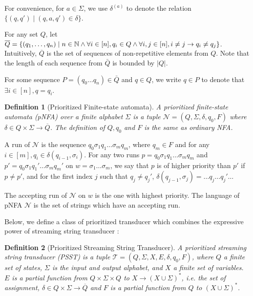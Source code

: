 \documentclass[sigplan,review,anonymous]{acmart}\settopmatter{printfolios=true,printccs=false,printacmref=false}
\newtheorem{definition}{Definition}
\newcommand\pnfa{\mathcal{N}}
\newcommand\psst{\mathcal{T}}
\begin{document}
For convenience, for $a \in \Sigma$, we use $\delta^{(a)}$ to denote the  relation $\{(q, q') \mid (q, a, q') \in \delta\}$.

For any set $Q$, let $\overline{Q} = \{ (q_1, \ldots, q_n) \mid n \in \mathbb{N} \wedge \forall i \in [n], q_i \in Q \wedge \forall i,j \in[n], i
  \neq j \rightarrow q_i \neq q_j \}$. Intuitively, $\overline{Q}$ is the set of
sequences of non-repetitive elements from $Q$. Note that the length of each sequence from $\bar{Q}$ is bounded by 
  $| Q |$.
  
For some sequence $P = (q_0 \ldots q_n) \in \bar{Q}$ and  $q \in Q$, we write $q \in P$ to denote that
  $\exists i \in [n], q = q_i$.

\begin{definition}[Prioritized Finite-state automata]
  A prioritized finite-state automata (pNFA) over a finite alphabet $\Sigma$ is a tuple $\pnfa=(Q, \Sigma, \delta, q_0, F)$ where $\delta \in Q
  \times \Sigma \rightarrow \overline{Q}$. The definition of $Q, q_0$ and $F$ is the same as ordinary NFA.
\end{definition}

A run of $\pnfa$ is the sequence $q_0 \sigma_1 q_1 \ldots \sigma_m q_m$, where $q_m \in F$ and for any $i \in [m], q_i \in \delta (q_{i - 1}, \sigma_i)$.
  For any two runs $p = q_0 \sigma_1 q_1 \ldots \sigma_m q_m$ and $p' =
  q_0 \sigma_1 q_1' \ldots \sigma_m q_m'$ on $w = \sigma_1 \ldots \sigma_m$, we say that $p$ is of higher priority than
  $p'$ if $p \neq p'$, and for the first index $j$ such that $q_j \neq q_j'$,
  $\delta (q_{j - 1}, \sigma_j) = \ldots q_j \ldots q_j' \ldots$
  
  The accepting run of $\pnfa$ on $w$ is the one with highest priority. The language of pNFA $\pnfa$ is the set of
  strings which have an accepting run.
  
  Below, we define a class of prioritized transducer \cite{BM17} which combines the expressive power of streaming string transducer \cite{AC10,AD11}:
  
\begin{definition}[Prioritized Streaming String Transducer]
A prioritized streaming string transducer (PSST) is a tuple $\psst = (Q, \Sigma, X, E, \delta, q_0, F)$, where $Q$ a
finite set of states, $\Sigma$ is the input and output alphabet, and $X$ a finite set of variables. $E$ is a partial function from $Q \times \Sigma \times
  Q$ to $X \rightarrow (X \cup \Sigma)^{\ast}$, i.e. the set of assignment,
  $\delta \in Q \times \Sigma \rightarrow \overline{Q}$ and $F$ is a partial function
  from $Q$ to $(X \cup \Sigma)^{\ast}$.
  
\end{definition}
\end{document}
